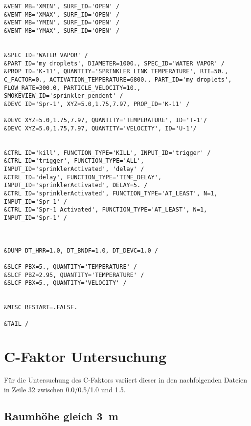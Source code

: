\begin{lstlisting}[emptylines=0,basicstyle=\tiny]
&VENT MB='XMIN', SURF_ID='OPEN' /  
&VENT MB='XMAX', SURF_ID='OPEN' /  
&VENT MB='YMIN', SURF_ID='OPEN' /  
&VENT MB='YMAX', SURF_ID='OPEN' / 

 
&SPEC ID='WATER VAPOR' /
&PART ID='my droplets', DIAMETER=1000., SPEC_ID='WATER VAPOR' /
&PROP ID='K-11', QUANTITY='SPRINKLER LINK TEMPERATURE', RTI=50., C_FACTOR=0., ACTIVATION_TEMPERATURE=6800., PART_ID='my droplets', FLOW_RATE=300.0, PARTICLE_VELOCITY=10., SMOKEVIEW_ID='sprinkler_pendent' /
&DEVC ID='Spr-1', XYZ=5.0,1.75,7.97, PROP_ID='K-11' /

&DEVC XYZ=5.0,1.75,7.97, QUANTITY='TEMPERATURE', ID='T-1'/
&DEVC XYZ=5.0,1.75,7.97, QUANTITY='VELOCITY', ID='U-1'/


&CTRL ID='kill', FUNCTION_TYPE='KILL', INPUT_ID='trigger' /
&CTRL ID='trigger', FUNCTION_TYPE='ALL', INPUT_ID='sprinklerActivated', 'delay' /
&CTRL ID='delay', FUNCTION_TYPE='TIME_DELAY', INPUT_ID='sprinklerActivated', DELAY=5. /
&CTRL ID='sprinklerActivated', FUNCTION_TYPE='AT_LEAST', N=1, INPUT_ID='Spr-1' /
&CTRL ID='Spr-1 Activated', FUNCTION_TYPE='AT_LEAST', N=1, INPUT_ID='Spr-1' /



&DUMP DT_HRR=1.0, DT_BNDF=1.0, DT_DEVC=1.0 /

&SLCF PBX=5., QUANTITY='TEMPERATURE' /
&SLCF PBZ=2.95, QUANTITY='TEMPERATURE' /
&SLCF PBX=5., QUANTITY='VELOCITY' /


&MISC RESTART=.FALSE.

&TAIL /
\end{lstlisting}


\section{C-Faktor Untersuchung}
Für die Untersuchung des C-Faktors variiert dieser in den nachfolgenden Dateien in Zeile 32 zwischen 0.0/0.5/1.0 und 1.5.
\subsection*{Raumhöhe gleich 3~m}

